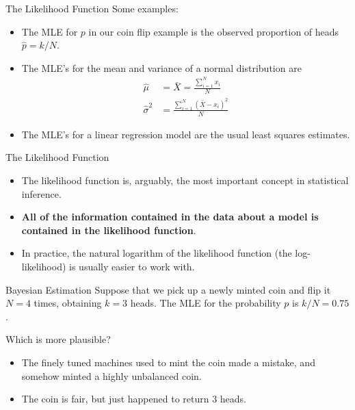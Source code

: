 \documentclass{beamer}
\begin{document}
\begin{frame}{The Likelihood Function}
Some examples:
        \begin{itemize}
                \item The MLE for $p$ in our coin flip example
                          is the observed proportion of heads $\hat{p} = k/N$.
                \item The MLE's for the mean and variance of a normal distribution are
                        \begin{align*}
                                \hat{\mu} &= \bar{X} = \frac{\sum_{i=1}^N x_i}{N} \\
                                \hat{\sigma}^2 &= \frac{\sum_{i=1}^N (\bar{X} - x_i)^2}{N}
                        \end{align*}
                \item The MLE's for a linear regression model are the usual least squares
                          estimates.
        \end{itemize}
\end{frame}

\begin{frame}{The Likelihood Function}
        \begin{itemize}
                \item The likelihood function is, arguably, the most important concept in
                          statistical inference.
                \item \textbf{All of the information contained in the data about a model is 
                               contained in the likelihood function}.
                \item In practice, the natural logarithm of the likelihood function
                         (the log-likelihood) is usually easier to work with.
        \end{itemize}
\end{frame}


\begin{frame}{Bayesian Estimation}
Suppose that we pick up a newly minted coin and flip it $N=4$ times, obtaining $k=3$ heads.
The MLE for the probability $p$ is $k/N = 0.75$.\par
Which is more plausible?
    \begin{itemize}
        \item The finely tuned machines used to mint the coin made a mistake, and somehow minted a  highly unbalanced coin.
        \item The coin is fair, but just happened to return 3 heads.
    \end{itemize}
\end{frame}
\end{document}
